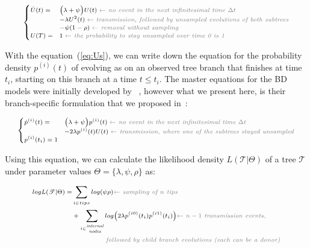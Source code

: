 \documentclass[a4paper,10pt]{article}
\begin{document}
\begin{equation}
\scriptsize
\begin{cases}
\dot{U}(t) = &\Big(\lambda + \psi\Big) U(t)\; \textit{\color{gray} $\leftarrow$ no event in the next infinitesimal time $\Delta t$ }\\
    &- \lambda U^2(t) \;  \textit{\color{gray} $\leftarrow$ transmission, followed by unsampled evolutions of both subtrees}\\
    &- \psi (1 - \rho)\;  \textit{\color{gray} $\leftarrow$ removal without sampling}\\
U(T) = & 1\;  \textit{\color{gray} $\leftarrow$ the probability to stay unsampled over time 0 is 1} \label{eq:Us}
\end{cases}
\end{equation}


With the equation~(\ref{eq:Us}), we can write down the equation for the probability density $p^{(i)}(t)$ of evolving as on an observed tree branch that finishes at time $t_i$, starting on this branch at a time $t \leq t_i$. The master equations for the BD models were initially developed by ~\citet{Stadler2009}, however what we present here, is their branch-specific formulation that we proposed in~\citep{zhukovaFastAccurateMaximumLikelihood2022}:

\begin{equation}
\scriptsize
\begin{cases}
\dot{p}^{(i)}(t) = & \Big(\lambda + \psi\Big) p^{(i)}(t)\; \textit{\color{gray} $\leftarrow$ no event in the next infinitesimal time $\Delta t$ }\\
    & - 2 \lambda p^{(i)}(t)U(t)\;  \textit{\color{gray} $\leftarrow$ transmission, where one of the subtrees stayed unsampled}\\
p^{(i)}(t_i) = 1
\end{cases}\label{eq:p}
\end{equation}

Using this equation, we can calculate the likelihood density $L(\mathscr{T}|\Theta)$ of a tree $\mathscr{T}$ under parameter values $\Theta = \{\lambda, \psi, \rho\}$ as:

\begin{equation}
\scriptsize
\begin{split}
log L(\mathscr{T}|\Theta) =  &\sum\limits_{i \in tips}  log(\psi \rho)  \textit{\color{gray} $\leftarrow$ sampling of $n$ tips} \\
 &+\sum\limits_{i \in \stackanchor{\tiny\textit{internal}}{\tiny\textit{nodes}}} log \big(2 \lambda p^{(i0)}(t_i)p^{(i1)}(t_i)\big)   \textit{\color{gray} $\leftarrow$ $n - 1$ transmission events,}\\
 & ~~~~~~~~~~~~~~~\textit{\color{gray} followed by child branch evolutions (each can be a donor)}  \label{eq:mtbd_tree_likelihood}
\end{split}
\end{equation}
\end{document}
